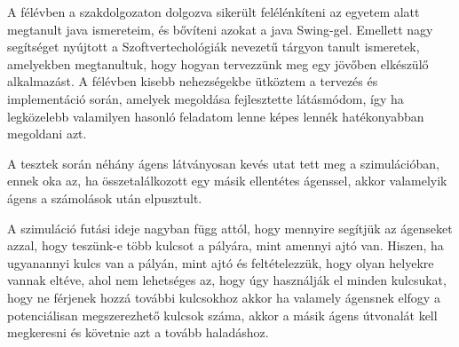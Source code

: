 
A félévben a szakdolgozaton dolgozva sikerült felélénkíteni az egyetem alatt megtanult java ismereteim,
és bővíteni azokat a java Swing-gel. Emellett nagy segítséget nyújtott a Szoftvertechológiák nevezetű tárgyon
tanult ismeretek, amelyekben megtanultuk, hogy hogyan tervezzünk meg egy jövőben elkészülő alkalmazást.
A félévben kisebb nehezségekbe ütköztem a tervezés és implementáció során, amelyek megoldása fejlesztette látásmódom,
így ha legközelebb valamilyen hasonló feladatom lenne képes lennék hatékonyabban megoldani azt.

A tesztek során néhány ágens látványosan kevés utat tett meg a szimulációban, ennek oka az, ha összetalálkozott egy másik
ellentétes ágenssel, akkor valamelyik ágens a számolások után elpusztult.

A szimuláció futási ideje nagyban függ attól, hogy mennyire segítjük az ágenseket azzal, hogy teszünk-e több kulcsot a pályára, mint
amennyi ajtó van. Hiszen, ha ugyanannyi kulcs van a pályán, mint ajtó és feltételezzük, hogy olyan helyekre vannak eltéve, ahol
nem lehetséges az, hogy úgy használják el minden kulcsukat, hogy ne férjenek hozzá további kulcsokhoz akkor ha valamely ágensnek elfogy
a potenciálisan megszerezhető kulcsok száma, akkor a másik ágens útvonalát kell megkeresni és követnie azt a tovább haladáshoz.